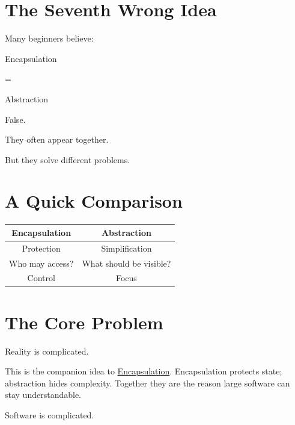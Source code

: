 \documentclass[11pt,a4paper]{book}
\begin{document}

\section{The Seventh Wrong Idea}

\begin{trap}

Many beginners believe:

Encapsulation

=

Abstraction

False.

They often appear together.

But they solve different problems.

\end{trap}


\section{A Quick Comparison}

\begin{center}

\begin{tabular}{|c|c|}
\hline
Encapsulation & Abstraction \\
\hline
Protection & Simplification \\
\hline
Who may access? & What should be visible? \\
\hline
Control & Focus \\
\hline
\end{tabular}

\end{center}


\section{The Core Problem}

Reality is complicated.

This is the companion idea to \hyperref[chap:encapsulation]{Encapsulation}. Encapsulation protects state; abstraction hides complexity. Together they are the reason large software can stay understandable.

Software is complicated.
\end{document}
